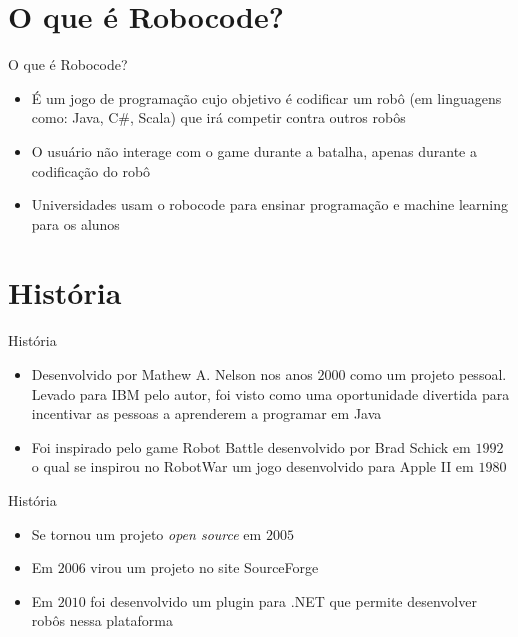 \section{O que é Robocode?}

\begin{frame}
	\begin{block}{O que é Robocode?}
		\begin{itemize}
			\item É um jogo de programação cujo objetivo é codificar um robô (em linguagens como: Java, C\#, Scala) que irá competir contra outros robôs

			\item O usuário não interage com o game durante a batalha, apenas durante a codificação do robô
			
			\item Universidades usam o robocode para ensinar programação e machine learning para os alunos \citep{ROBOWIKI}
			
		\end{itemize}
	\end{block}
\end{frame}


\section{História}

\begin{frame}
	\begin{block}{História}
		\begin{itemize}
			\item Desenvolvido por Mathew A. Nelson nos anos $2000$ como um projeto pessoal. Levado para IBM pelo autor, foi visto como uma oportunidade divertida para incentivar as pessoas a aprenderem a programar em Java

			\item Foi inspirado pelo game Robot Battle desenvolvido por Brad Schick em $1992$ o qual se inspirou no RobotWar um jogo desenvolvido para Apple II em $1980$
			
		\end{itemize}
	\end{block}
\end{frame}


\begin{frame}
	\begin{block}{História}
		\begin{itemize}
		
			\item Se tornou um projeto \emph{open source} em $2005$
			
			\item Em $2006$ virou um projeto no site SourceForge

			\item Em $2010$ foi desenvolvido um plugin para .NET que permite desenvolver robôs nessa plataforma \citep{readmeRobo}
						
		\end{itemize}
	\end{block}
\end{frame}


